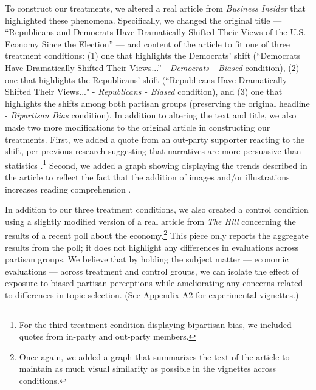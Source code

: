 \documentclass[12pt, letterpaper]{article}
\begin{document}
To construct our treatments, we altered a real article from \textit{Business Insider} that highlighted these phenomena. Specifically, we changed the original title --- ``Republicans and Democrats Have Dramatically Shifted Their Views of the U.S. Economy Since the Election'' \citep{bi_2016} --- and content of the article to fit one of three treatment conditions: (1) one that highlights the Democrats' shift (``Democrats Have Dramatically Shifted Their Views...'' - \textit{Democrats - Biased} condition), (2) one that highlights the Republicans' shift (``Republicans Have Dramatically Shifted Their Views..." - \textit{Republicans - Biased} condition), and (3) one that highlights the shifts among both partisan groups (preserving the original headline - \textit{Bipartisan Bias} condition). In addition to altering the text and title, we also made two more modifications to the original article in constructing our treatments. First, we added a quote from an out-party supporter reacting to the shift, per previous research suggesting that narratives are more persuasive than statistics \citep{Kahneman2011}.\footnote{For the third treatment condition displaying bipartisan bias, we included quotes from in-party and out-party members.} Second, we added a graph showing displaying the trends described in the article to reflect the fact that the addition of images and/or illustrations increases reading comprehension \citep{gambrelljawitz_1993}. 

In addition to our three treatment conditions, we also created a control condition using a slightly modified version of a real article from \textit{The Hill} concerning the results of a recent poll about the economy.\footnote{Once again, we added a graph that summarizes the text of the article to maintain as much visual similarity as possible in the vignettes across conditions.} This piece only reports the aggregate results from the poll; it does not highlight any differences in evaluations across partisan groups. We believe that by holding the subject matter --- economic evaluations --- across treatment and control groups, we can isolate the effect of exposure to biased partisan perceptions while ameliorating any concerns related to differences in topic selection. (See Appendix A2 for experimental vignettes.) 
\end{document}
